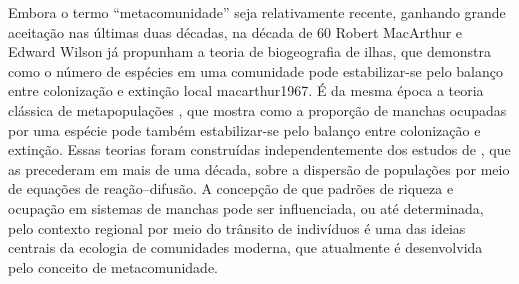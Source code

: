 \documentclass[12pt]{extarticle}
\begin{document}
Embora o termo ``metacomunidade'' seja relativamente recente, ganhando grande
aceitação nas últimas duas décadas, na década de 60 Robert MacArthur e Edward Wilson
já propunham a
teoria de biogeografia de ilhas, que demonstra como o número de espécies em uma comunidade pode estabilizar-se
pelo balanço entre colonização e extinção local {macarthur1967}. 
É da mesma época a teoria clássica de metapopulações \citep{levins1969,levins1971}, 
que mostra como a proporção de manchas ocupadas por uma espécie pode também estabilizar-se pelo 
balanço entre colonização e extinção. Essas teorias foram construídas
independentemente dos estudos de \citet{skellam1951}, que as precederam em
mais de uma década, sobre a dispersão de populações por meio de equações de
reação--difusão.
A concepção de que padrões de riqueza e ocupação em sistemas de manchas pode ser influenciada, ou até
determinada, pelo contexto regional por meio do trânsito de indivíduos 
é uma das ideias centrais da ecologia de
comunidades moderna, que atualmente é desenvolvida pelo conceito de
metacomunidade.
\end{document}
